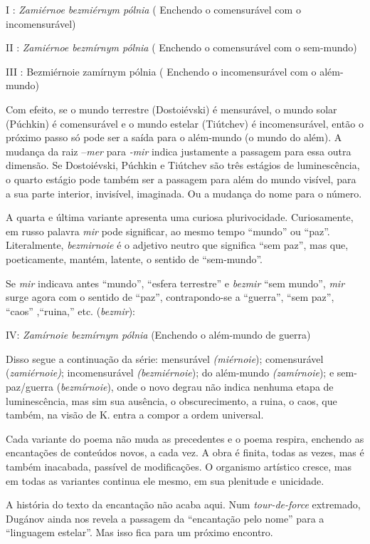 I : \emph{Zamiérnoe bezmiérnym pólnia} ( Enchendo o comensurável com o
incomensurável)

II : \emph{Zamiérnoe bezmírnym pólnia} ( Enchendo o comensurável com o
sem-mundo)

III : Bezmiérnoie zamírnym pólnia ( Enchendo o incomensurável com o
além-mundo)

Com efeito, se o mundo terrestre (Dostoiévski) é mensurável, o mundo
solar (Púchkin) é comensurável e o mundo estelar (Tiútchev) é
incomensurável, então o próximo passo só pode ser a saída para o
além-mundo (o mundo do além). A mudança da raiz --\emph{mer} para
\emph{-mir} indica justamente a passagem para essa outra dimensão. Se
Dostoiévski, Púchkin e Tiútchev são três estágios de luminescência, o
quarto estágio pode também ser a passagem para além do mundo visível,
para a sua parte interior, invisível, imaginada. Ou a mudança do nome
para o número.

A quarta e última variante apresenta uma curiosa plurivocidade.
Curiosamente, em russo palavra \emph{mir} pode significar, ao mesmo
tempo ``mundo'' ou ``paz''. Literalmente, \emph{bezmirnoie} é o adjetivo
neutro que significa ``sem paz'', mas que, poeticamente, mantém,
latente, o sentido de ``sem-mundo''.

Se \emph{mir} indicava antes ``mundo'', ``esfera terrestre'' e
\emph{bezmir} ``sem mundo'', \emph{mir} surge agora com o sentido de
``paz'', contrapondo-se a ``guerra'', ``sem paz'', ``caos'' ,``ruina,''
etc. (\emph{bezmir}):

IV: \emph{Zamírnoie bezmírnym pólnia} (Enchendo o além-mundo de guerra)

Disso segue a continuação da série: mensurável \emph{(miérnoie});
comensurável (\emph{zamiérnoie)}; incomensurável \emph{(bezmiérnoie});
do além-mundo \emph{(zamírnoie}); e sem-paz/guerra (\emph{bezmírnoie}),
onde o novo degrau não indica nenhuma etapa de luminescência, mas sim
sua ausência, o obscurecimento, a ruina, o caos, que também, na visão de
K. entra a compor a ordem universal.

Cada variante do poema não muda as precedentes e o poema respira,
enchendo as encantações de conteúdos novos, a cada vez. A obra é finita,
todas as vezes, mas é também inacabada, passível de modificações. O
organismo artístico cresce, mas em todas as variantes continua ele
mesmo, em sua plenitude e unicidade.

A história do texto da encantação não acaba aqui. Num
\emph{tour-de-force} extremado, Dugánov ainda nos revela a passagem da
``encantação pelo nome'' para a ``linguagem estelar''. Mas isso fica
para um próximo encontro.

